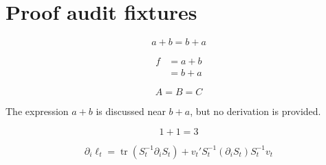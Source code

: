 \section{Proof audit fixtures}

\begin{equation}\label{eq:proof-audit-single}
a + b = b + a
\end{equation}

\begin{align}\label{eq:proof-audit-chain}
f &= a + b \\
  &= b + a
\end{align}

\begin{equation}\label{eq:proof-audit-ambiguous}
A = B = C
\end{equation}

\begin{proposition}\label{prop:proof-audit-nearby}
The expression $a + b$ is discussed near $b + a$, but no derivation is provided.
\end{proposition}

\begin{equation}\label{eq:proof-audit-false}
1 + 1 = 3
\end{equation}

\begin{equation}\label{eq:proof-audit-kalman}
\partial_i \ell_t = \operatorname{tr}(S_t^{-1}\partial_i S_t) + v_t' S_t^{-1} (\partial_i S_t) S_t^{-1} v_t
\end{equation}
